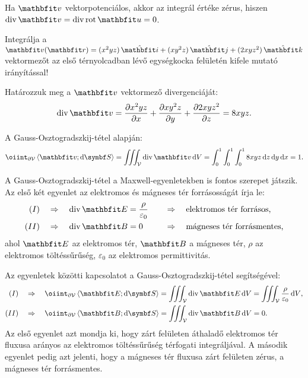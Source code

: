 \documentclass{szb-practice}
\begin{document}
\begin{note}
  Ha $\rvec v$ vektorpotenciálos, akkor az integrál értéke zérus, hiszen
  $\Div \rvec v = \Div \rot \rvec u = 0$.
\end{note}

\begin{example}
  Integrálja a $\rvec v(\coordv) = \ijk{x^2 y z}{x y^2 z}{2 x y z^2}$
  vektormezőt az első térnyolcadban lévő egységkocka felületén kifele mutató
  irányítással!

  Határozzuk meg a $\rvec v$ vektormező divergenciáját:
  $$
    \Div \rvec v
    = \pdv{x^2 y z}{x} + \pdv{x y^2 z}{y} + \pdv{2 x y z^2}{z}
    = 8 x y z
    \text.
  $$

  A Gauss-Osztogradszkij-tétel alapján:
  $$
    \oiint_{\partial \volimage} \scalar{\rvec v}{\dd \surfvec}
    = \iiint_{\volimage} \Div \rvec v \dd \volscalar
    = \int_0^1 \int_0^1 \int_0^1 8 x y z \dd z \dd y \dd x
    = 1
    \text.
  $$
\end{example}

\begin{learnMore}
  A Gauss-Osztogradszkij-tétel a Maxwell-egyenletekben is fontos szerepet
  játszik. Az első két egyenlet az elektromos és mágneses tér forrásosságát
  írja le:
  $$
    \begin{aligned}
      (I)  & \quad \Rightarrow \quad \Div \rvec E = \frac{\rho}{\varepsilon_0}
           &
           & \quad \Rightarrow \quad \text{elektromos tér forrásos,}
      \\
      (II) & \quad \Rightarrow \quad \Div \rvec B = 0
           &
           & \quad \Rightarrow \quad \text{mágneses tér forrásmentes,}
    \end{aligned}
  $$
  ahol $\rvec E$ az elektromos tér, $\rvec B$ a mágneses tér,
  $\rho$ az elektromos töltéssűrűség, $\varepsilon_0$ az elektromos
  permittivitás.

  Az egyenletek közötti kapcsolatot a Gauss-Osztogradszkij-tétel segítségével:
  $$
    \begin{aligned}
      (I)  & \quad \Rightarrow \quad
      \oiint_{\partial \volimage} \scalar{\rvec E}{\dd \surfvec}
      = \iiint_{\volimage} \Div \rvec E \dd \volscalar
      = \iiint_{\volimage} \frac{\rho}{\varepsilon_0} \dd \volscalar
      \text,
      \\
      (II) & \quad \Rightarrow \quad
      \oiint_{\partial \volimage} \scalar{\rvec B}{\dd \surfvec}
      = \iiint_{\volimage} \Div \rvec B \dd \volscalar
      = 0
      \text.
    \end{aligned}
  $$
  Az első egyenlet azt mondja ki, hogy zárt felületen áthaladő elektromos
  tér fluxusa arányos az elektromos töltéssűrűség térfogati integráljával.
  A második egyenlet pedig azt jelenti, hogy a mágneses tér fluxusa zárt
  felületen zérus, a mágneses tér forrásmentes.
\end{learnMore}
\end{document}
